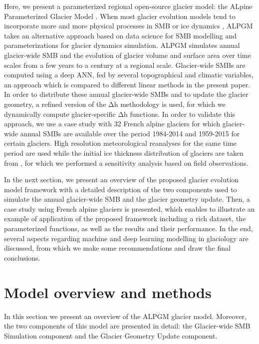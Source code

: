 Here, we present a parameterized regional open-source glacier model: the ALpine Parameterized Glacier Model \cite[ALPGM,][]{bolibar_jordibolibar/alpgm:_2019}. When most glacier evolution models tend to incorporate more and more physical processes in SMB or ice dynamics \citep[e.g.,][]{maussion_open_2019, zekollari_modelling_2019}, ALPGM takes an alternative approach based on data science for SMB modelling and parameterizations for glacier dynamics simulation. ALPGM simulates annual glacier-wide SMB and the evolution of glacier volume and surface area over time scales from a few years to a century at a regional scale. Glacier-wide SMBs are computed using a deep ANN, fed by several topographical and climatic variables, an approach which is compared to different linear methods in the present paper. In order to distribute these annual glacier-wide SMBs and to update the glacier geometry, a refined version of the Δh methodology \citep[e.g.,][]{huss_modelling_2008} is used, for which we dynamically compute glacier-specific Δh functions. In order to validate this approach, we use a case study with 32 French alpine glaciers for which glacier-wide annual SMBs are available over the period 1984-2014 and 1959-2015 for certain glaciers. High resolution meteorological reanalyses for the same time period are used \citep[SAFRAN,][]{durand_reanalysis_2009} while the initial ice thickness distribution of glaciers are taken from \citet{farinotti_consensus_2019}, for which we performed a sensitivity analysis based on field observations.

In the next section, we present an overview of the proposed glacier evolution model framework with a detailed description of the two components used to simulate the annual glacier-wide SMB and the glacier geometry update. Then, a case study using French alpine glaciers is presented, which enables to illustrate an example of application of the proposed framework including a rich dataset, the parameterized functions, as well as the results and their performance. In the end, several aspects regarding machine and deep learning modelling in glaciology are discussed, from which we make some recommendations and draw the final conclusions.


\section{Model overview and methods} \label{methods:methods}

In this section we present an overview of the ALPGM glacier model. Moreover, the two components of this model are presented in detail: the Glacier-wide SMB Simulation component and the Glacier Geometry Update component.

